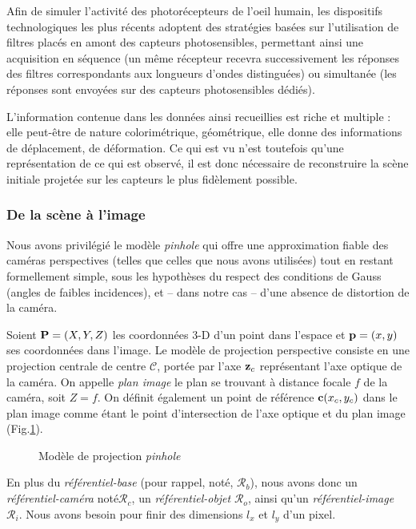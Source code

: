  Afin de simuler l'activité des photorécepteurs de l'oeil humain, les dispositifs technologiques les plus récents adoptent des stratégies basées sur l'utilisation de filtres placés en amont des capteurs photosensibles, permettant ainsi une acquisition en séquence (un même récepteur recevra successivement les réponses des filtres correspondants aux longueurs d'ondes distinguées) ou simultanée (les réponses sont envoyées sur des capteurs photosensibles dédiés).
  
L'information contenue dans les données ainsi recueillies est riche et multiple : elle peut-être de nature colorimétrique, géométrique, elle donne des informations de déplacement, de déformation. Ce qui est vu n'est toutefois qu'une représentation de ce qui est observé, il est donc nécessaire de reconstruire la scène initiale projetée sur les capteurs le plus fidèlement possible.
 
\subsubsection{De la scène à l'image}
 
Nous avons privilégié le modèle {\it pinhole} qui offre une approximation fiable des caméras perspectives (telles que celles que nous avons utilisées) tout en restant formellement simple\cite{Faugeras:1993}, sous les hypothèses du respect des conditions de Gauss (angles de faibles incidences), et -- dans notre cas -- d'une absence de distortion de la caméra.

Soient ${\bf P} = (X, Y, Z)$ les coordonnées 3-D d'un point dans l'espace et ${\bf p} = (x, y)$ ses coordonnées dans l'image. Le modèle de projection perspective consiste en une projection centrale de centre $\mathcal C$, portée par l'axe ${\bf z}_c$ représentant l'axe optique de la caméra. On appelle {\it plan image} le plan se trouvant à distance focale $f$ de la caméra, soit $Z = f$. On définit également un point de référence ${\bf c}(x_c,y_c)$ dans le plan image comme étant le point d'intersection de l'axe optique et du plan image (Fig.\ref{intro:fig12}).

\begin{figure}[h!tp]
  \centering
  \def\svgwidth{.95\linewidth}
  
    \caption{\footnotesize{Modèle de projection {\it pinhole}}}
\label{intro:fig12}
\end{figure}

En plus du {\it référentiel-base} (pour rappel, noté, $\mathcal R_b$), nous avons donc un {\it référentiel-caméra} noté$\mathcal R_c$, un {\it référentiel-objet} $\mathcal R_o$, ainsi qu'un {\it référentiel-image} $\mathcal R_i$. Nous avons besoin pour finir des dimensions $l_x$ et $l_y$ d'un pixel.

